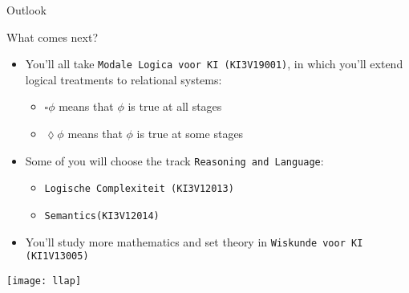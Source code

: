 \documentclass[../slides.tex]{subfiles}
\begin{document}
\begin{frame}{Outlook}

What comes next?
  
  \begin{itemize}
  \item You'll all take \texttt{Modale Logica voor KI (KI3V19001)}, in
    which you'll extend logical treatments to relational systems:
    \begin{itemize}
    \item $\square \phi$ means that $\phi$ is true at all stages
      \item $\lozenge\phi$ means that $\phi$ is true at some stages
      \end{itemize}
      \item Some of you will choose the track \texttt{Reasoning and
          Language}:
        \begin{itemize}
        \item \texttt{Logische Complexiteit (KI3V12013)}
          \item \texttt{Semantics(KI3V12014)}
          \end{itemize}
          \item You'll study more mathematics and set theory in
            \texttt{Wiskunde voor KI (KI1V13005)}
  \end{itemize}
  
\end{frame}


\begin{frame}
  
\begin{center}
  \texttt{[image: llap]}
\end{center}

\end{frame}
\end{document}
